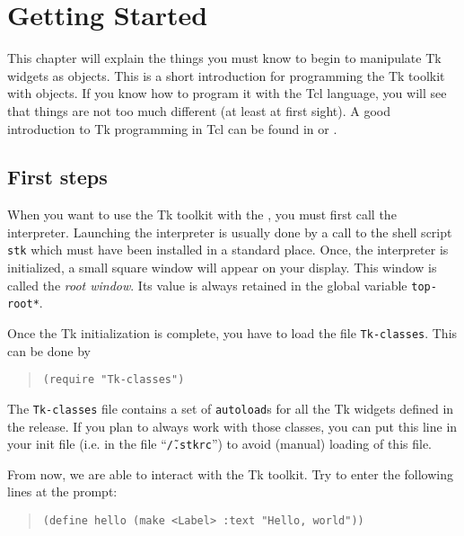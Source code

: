 %
%

\chapter{Getting Started}



This chapter will explain the things you must know to begin to manipulate Tk
widgets as {\stklos} objects. This is a short introduction for programming the
Tk toolkit with objects. If you know how to program it with the Tcl language,
you will see that things are not too much different (at least at first
sight). A good introduction to Tk programming in Tcl can be found in
\cite{Ouster-bok} or \cite{Welch-book}.

\section{First steps}

When you want to use the Tk toolkit with the {\stklos}, you must first call
the {\stk} interpreter. Launching the interpreter is usually done by a
call to the shell script {\tt stk} which must have been installed in a
standard place. Once, the interpreter is initialized, a small square window
will appear on your display. This window is called the {\em root
window}. Its value is always retained in the global
variable {\tt *top-root*}.

Once the Tk initialization is complete, you have to load the file 
{\tt Tk-classes}. This can be done by 
\begin{quote}
\begin{verbatim}
(require "Tk-classes")
\end{verbatim}
\end{quote}

The {\tt Tk-classes} file contains a set of {\tt autoload}s for all the
Tk widgets defined in the {\stk} release. If you plan to always work with
those classes, you can put this line in your {\stk} init file (i.e. in the
file ``{\tt \~/.stkrc}'') to avoid (manual) loading of this file.

From now, we are able to interact with the Tk toolkit. Try to enter the following
lines at the {\stk} prompt: 
\begin{quote}
\begin{verbatim}        
(define hello (make <Label> :text "Hello, world"))
\end{verbatim}
\end{quote}

